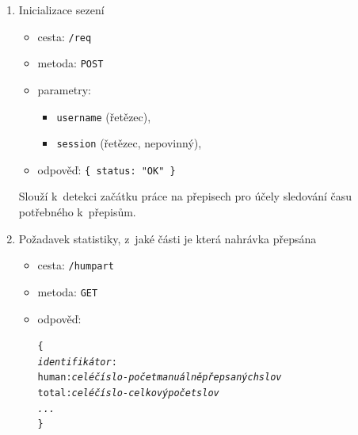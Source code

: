 \begin{enumerate}
{    Verze se inkrementuje při každém příspěvku. Slouží k~tomu, aby se mohly cachovat
    přepisy, ale aby se cache nepoužila, pokud někdo přepis změnil.
}
\item{
    Inicializace sezení
    \begin{itemize}
      \item{cesta: \texttt{/req}}
      \item{metoda: \texttt{POST}}
      \item{parametry:
        \begin{itemize}
          \item{\texttt{username} (řetězec),}
          \item{\texttt{session} (řetězec, nepovinný),}
        \end{itemize}
      }
      \item{odpověď: \texttt{\{ status: "OK" \}}}
    \end{itemize}

    Slouží k~detekci začátku práce na přepisech pro účely sledování času
    potřebného k~přepisům.
}
\item{
    Požadavek statistiky, z~jaké části je která nahrávka přepsána
    \begin{itemize}
      \item{cesta: \texttt{/humpart}}
      \item{metoda: \texttt{GET}}
      \item{odpověď: \begin{alltt}\{
  {\em identifikátor}:
      human: {\em celé číslo - počet manuálně přepsaných slov}
      total: {\em celé číslo - celkový počet slov}
  {\em ...}
\}\end{alltt}
      }
    \end{itemize}

}
\end{enumerate}

